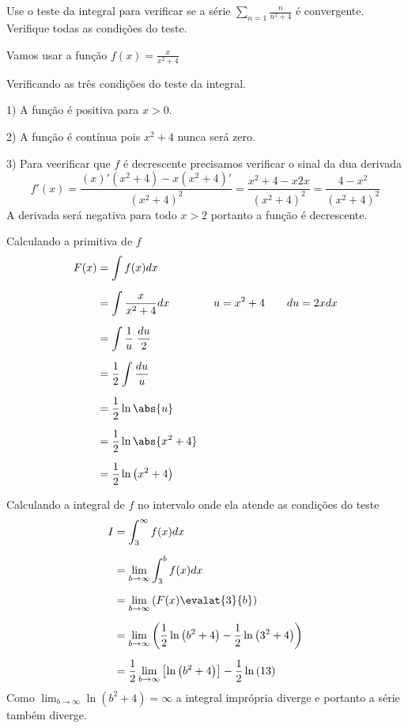 \documentclass[a4paper,12pt,fleqn]{article}
\begin{document}

Use o teste da integral para verificar se a série
\(
  \sum_{n=1} \frac{n}{n^2+4}
\)
é convergente. Verifique todas as condições do teste.

\begin{answer}
  Vamos usar a função
  \(
    f(x) = \frac{x}{x^2+4}
  \)

  Verificando as três condições do teste da integral.

  1) A função é positiva para $x>0$.

  2) A função é contínua pois \(x^2+4\) nunca será zero.

  3) Para veerificar que $f$ é decrescente precisamos verificar o sinal da
  dua derivada
  \[
    f'(x)
    = \frac{(x)'(x^2+4)-x(x^2+4)'}{(x^2+4)^2}
    = \frac{x^2+4 -x2x}{(x^2+4)^2}
    = \frac{4-x^2}{(x^2+4)^2}
  \]
  A derivada será negativa para todo $x>2$ portanto a função é decrescente.

  Calculando a primitiva de $f$
  \begin{align*}
    F(x)
    & = \int f(x) dx \\[2mm]
    & = \int \frac{x}{x^2+4} dx \qquad\qquad u=x^2+4 \qquad du = 2xdx \\[2mm]
    & = \int \frac{1}{u}\; \frac{du}{2} \\[2mm]
    & = \frac{1}{2} \int \frac{du}{u} \\[2mm]
    & = \frac{1}{2} \ln\abs{u} \\[2mm]
    & = \frac{1}{2} \ln\abs{x^2+4} \\[2mm]
    & = \frac{1}{2} \ln\left(x^2+4\right)
  \end{align*}

  Calculando a integral de $f$ no intervalo onde ela atende as condições do teste
  \begin{align*}
    I
    & = \int_3^\infty f(x) dx \\[2mm]
    & = \lim_{b\to\infty} \int_3^b f(x) dx \\[2mm]
    & = \lim_{b\to\infty} \left(F(x)\evalat{3}{b}\right) \\[2mm]
    & = \lim_{b\to\infty}
        \left(\frac{1}{2}\ln\left(b^2+4\right)-\frac{1}{2}\ln\left(3^2+4\right)\right)
        \\[2mm]
    & = \frac{1}{2}\lim_{b\to\infty} \left[\ln\left(b^2+4\right)\right] - \frac{1}{2}\ln\left(13\right)
  \end{align*}
  Como \(\lim_{b\to\infty} \ln\left(b^2+4\right)=\infty\)
  a integral imprópria diverge e portanto a série também diverge.
  \clearpage
\end{answer}
\end{document}
